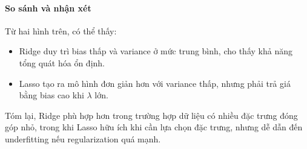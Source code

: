 \paragraph{So sánh và nhận xét}

Từ hai hình trên, có thể thấy:
\begin{itemize}
    \item Ridge duy trì bias thấp và variance ở mức trung bình, cho thấy khả năng tổng quát hóa ổn định.
    \item Lasso tạo ra mô hình đơn giản hơn với variance thấp, nhưng phải trả giá bằng bias cao khi $\lambda$ lớn.
\end{itemize}

Tóm lại, Ridge phù hợp hơn trong trường hợp dữ liệu có nhiều đặc trưng đóng góp nhỏ, trong khi Lasso hữu ích khi cần lựa chọn đặc trưng, nhưng dễ dẫn đến underfitting nếu regularization quá mạnh.
